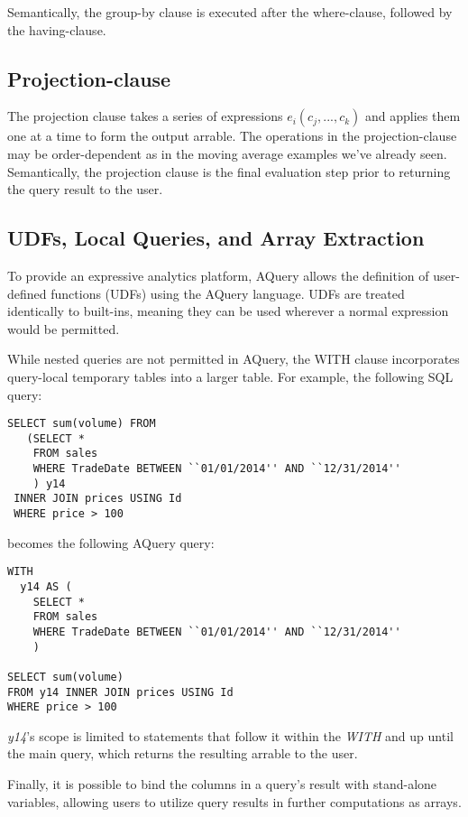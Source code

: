 \documentclass{acm_proc_article-sp}
\begin{document}
Semantically, the group-by clause is executed after the where-clause, followed by the having-clause.




\subsection{Projection-clause}
The projection clause takes a series of expressions $e_i(c_j, ..., c_k)$ and applies them one at a time to form the output arrable. The operations in the projection-clause may be order-dependent as in the moving average examples we've already seen. Semantically, the projection clause is the final evaluation step prior to returning the query result to the user.


\subsection{UDFs,  Local Queries, and Array Extraction}
To provide an expressive analytics platform, AQuery allows the definition of  user-defined functions (UDFs) using the AQuery language. UDFs are treated identically to built-ins, meaning they can be used wherever a normal expression would be permitted.

While nested queries are not permitted in AQuery, the WITH clause incorporates  query-local temporary tables into a larger table. For example, the following SQL query:

\begin{lstlisting}
SELECT sum(volume) FROM 
   (SELECT * 
    FROM sales 
    WHERE TradeDate BETWEEN ``01/01/2014'' AND ``12/31/2014''
    ) y14
 INNER JOIN prices USING Id 
 WHERE price > 100
\end{lstlisting}

becomes the following AQuery query:

\begin{lstlisting}
WITH
  y14 AS (
  	SELECT * 
  	FROM sales 
  	WHERE TradeDate BETWEEN ``01/01/2014'' AND ``12/31/2014''
  	)
  
SELECT sum(volume) 
FROM y14 INNER JOIN prices USING Id
WHERE price > 100
\end{lstlisting}

\textit{y14}'s scope is limited to statements that follow it within the \textit{WITH} and up until the main query, which returns the resulting arrable to the user.

Finally, it is possible to bind the columns in a query's result with stand-alone variables, allowing users to utilize query results in further computations as arrays.
\end{document}
